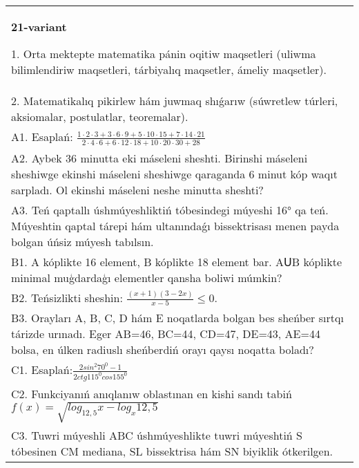 \documentclass{article}
\begin{document}
\begin{tabular}{m{17cm}}
\textbf{21-variant}

1. Orta mektepte matematika pánin oqitiw maqsetleri (uliwma bilimlendiriw maqsetleri, tárbiyalıq maqsetler, ámeliy maqsetler). \\
2. Matematikalıq pikirlew hám juwmaq shıǵarıw (súwretlew túrleri, aksiomalar, postulatlar, teoremalar). \\
A1. Esaplań: \(\frac{1 \cdot 2 \cdot 3 + 3 \cdot 6 \cdot 9 + 5 \cdot 10 \cdot 15 + 7 \cdot 14 \cdot 21}{2 \cdot 4 \cdot 6 + 6 \cdot 12 \cdot 18 + 10 \cdot 20 \cdot 30 + 28}\) \\
A2. Aybek 36 minutta eki máseleni sheshti. Birinshi máseleni sheshiwge ekinshi máseleni sheshiwge qaraganda 6 minut kóp waqıt sarpladı. Ol ekinshi máseleni neshe minutta sheshti? \\
A3. Teń qaptallı úshmúyeshliktiń tóbesindegi múyeshi 16° qa teń. Múyeshtin qaptal tárepi hám ultanındaǵı bissektrisası menen payda bolgan úńsiz múyesh tabılsın. \\
B1. A kóplikte 16 element, B kóplikte 18 element bar. AՍB kóplikte minimal muģdardaģı elementler qansha boliwi múmkin? \\
B2. Teńsizlikti sheshin: \(\frac{ (x + 1) (3 - 2x) }{x - 5} \leq 0\). \\
B3. Orayları A, B, C, D hám E noqatlarda bolgan bes sheńber sırtqı tárizde urınadı. Eger AB=46, BC=44, CD=47, DE=43, AE=44 bolsa, en úlken radiuslı sheńberdiń orayı qaysı noqatta boladı? \\
C1. Esaplań:\(\frac{2sin^{2}70^{0} - 1}{2ctg115^{0}cos155^{0}}\) \\
C2. Funkciyanıń anıqlanıw oblastınan en kishi sandı tabiń \(f (x) = \sqrt{log_{12,5}x - log_{x}12,5}\) \\
C3. Tuwri múyeshli ABC úshmúyeshlikte tuwri múyeshtiń S tóbesinen CM mediana, SL bissektrisa hám SN biyiklik ótkerilgen. \\

\end{tabular}
\vspace{1cm}
\end{document}
